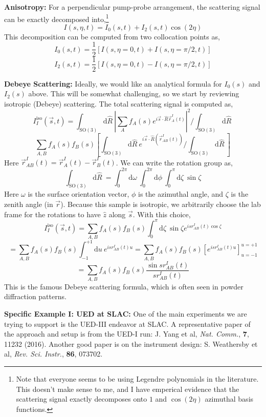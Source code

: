 \documentclass[fleqn,oneside,12pt]{article}
\begin{document}
\textbf{Anisotropy:} For a perpendicular pump-probe arrangement, the scattering
signal can be exactly decomposed into,\footnote{Note that everyone seems to be
using Legendre polynomials in the literature. This doesn't make sense to me, and
I have emperical evidence that the scattering signal exactly decomposes onto $1$
and $\cos (2 \eta)$ azimuthal basis functions.}
\[
I (s, \eta, t)
=
I_{0} (s, t)
+
I_{2} (s, t) \cos (2 \eta)
\]
This decomposition can be computed from two collocation points as,
\[
I_{0} (s, t)
=
\frac{1}{2}
\left [
I (s, \eta=0, t)
+
I (s, \eta=\pi/2, t)
\right ]
\]
\[
I_{2} (s, t)
=
\frac{1}{2}
\left [
I (s, \eta=0, t)
-
I (s, \eta=\pi/2, t)
\right ]
\]

\textbf{Debeye Scattering:} Ideally, we would like an analytical formula for
$I_{0} (s)$ and $I_{2} (s)$ above. This will be somewhat challenging, so we
start by reviewing isotropic (Debeye) scattering. The total scattering signal is
computed as, 
\[
I_{I}^{\mathrm{iso}} (\vec s, t)
=
\int_{\mathrm{SO(3)}}
\mathrm{d} \hat R \
\left |
\sum_{A}
f_{A} (s)
e^{i \vec s \cdot \hat R \vec r_{A}^{I} (t)}
\right |^2
/ 
\int_{\mathrm{SO(3)}}
\mathrm{d} \hat R \
\]
\[
\sum_{A,B}
f_{A} (s)
f_{B} (s)
\left [
\int_{\mathrm{SO(3)}}
\mathrm{d} \hat R \
e^{i \vec s \cdot \hat R (\vec r_{AB}^{I} (t))}
/
\int_{\mathrm{SO(3)}}
\mathrm{d} \hat R \
\right ]
\]
Here $\vec r_{AB}^{I} (t) = \vec r_{A}^{I} (t) - \vec r_{B}^{I} (t)$. We can
write the rotation group as,
\[
\int_{\mathrm{SO(3)}}
\mathrm{d} \hat R \
=
\int_{0}^{2 \pi}
\mathrm{d} \omega \
\int_{0}^{2 \pi}
\mathrm{d} \phi \
\int_{0}^{\pi}
\mathrm{d} \zeta \
\sin \zeta
\]
Here $\omega$ is the surface orientation vector, $\phi$ is the azimuthal angle,
and $\zeta$ is the zenith angle (in $\vec r$). Because this sample is isotropic,
we arbitrarily choose the lab frame for the rotations to have $\hat z$ along
$\vec s$. With this choice,
\[
I_{I}^{\mathrm{iso}} (\vec s, t)
=
\sum_{A,B}
f_{A} (s)
f_{B} (s)
\int_{0}^{\pi}
\mathrm{d} \zeta \
\sin \zeta
e^{i s r_{AB}^{I} (t) \cos \zeta}
\]
\[
=
\sum_{A,B}
f_{A} (s)
f_{B} (s)
\int_{-1}^{+1}
\mathrm{d} u \
e^{i s r_{AB}^{I} (t) u}
=
\sum_{A,B}
f_{A} (s)
f_{B} (s)
\left [
e^{i s r_{AB}^{I} (t) u}
\right ]_{u=-1}^{u=+1}
\]
\[
=
\sum_{A,B}
f_{A} (s)
f_{B} (s)
\frac{\sin s r_{AB}^{I} (t)}{s r_{AB}^{I} (t)}
\]
This is the famous Debeye scattering formula, which is often seen in powder
diffraction patterns.

\textbf{Specific Example I: UED at SLAC:} One of the main experiments we are
trying to support is the UED-III endeavor at SLAC. A representative paper of the
approach and setup is from the UED-I run: J. Yang et al, \emph{Nat. Comm.},
\textbf{7}, 11232 (2016). Another good paper is on the instrument design: S.
Weathersby et al, \emph{Rev. Sci. Instr.}, \textbf{86}, 073702. 
\end{document}
